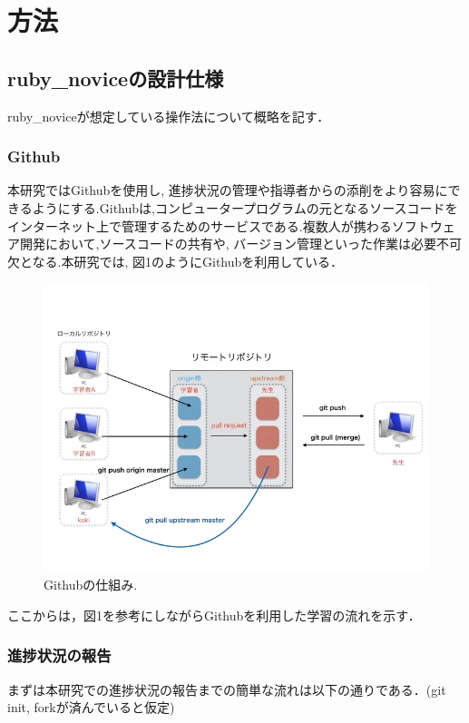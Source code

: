 \section{方法}
\subsection{ruby\_noviceの設計仕様}
ruby\_noviceが想定している操作法について概略を記す．

\subsubsection{Github}
本研究ではGithubを使用し, 進捗状況の管理や指導者からの添削をより容易にできるようにする.Githubは,コンピュータープログラムの元となるソースコードをインターネット上で管理するためのサービスである.複数人が携わるソフトウェア開発において,ソースコードの共有や, バージョン管理といった作業は必要不可欠となる\cite{2}.本研究では, 図1のようにGithubを利用している．

\begin{figure}[htbp]\begin{center}
\includegraphics[width=12cm,bb= 0 0 737 553]{../figs/./ruby_novice.006.jpg}
\caption{Githubの仕組み.}
\label{default}\end{center}\end{figure}
ここからは，図1を参考にしながらGithubを利用した学習の流れを示す．

\subsubsection{進捗状況の報告}
まずは本研究での進捗状況の報告までの簡単な流れは以下の通りである．(git init, forkが済んでいると仮定)

